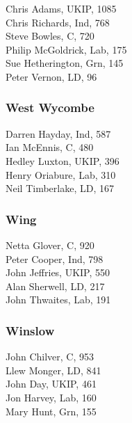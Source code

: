 \documentclass[a4paper,openany,10pt]{book}
\begin{document}


Chris Adams, UKIP, 1085\\
Chris Richards, Ind, 768\\
Steve Bowles, C, 720\\
Philip McGoldrick, Lab, 175\\
Sue Hetherington, Grn, 145\\
Peter Vernon, LD, 96\\


\subsubsection*{West Wycombe}



Darren Hayday, Ind, 587\\
Ian McEnnis, C, 480\\
Hedley Luxton, UKIP, 396\\
Henry Oriabure, Lab, 310\\
Neil Timberlake, LD, 167\\


\subsubsection*{Wing}



Netta Glover, C, 920\\
Peter Cooper, Ind, 798\\
John Jeffries, UKIP, 550\\
Alan Sherwell, LD, 217\\
John Thwaites, Lab, 191\\


\subsubsection*{Winslow}



John Chilver, C, 953\\
Llew Monger, LD, 841\\
John Day, UKIP, 461\\
Jon Harvey, Lab, 160\\
Mary Hunt, Grn, 155\\
\end{document}
